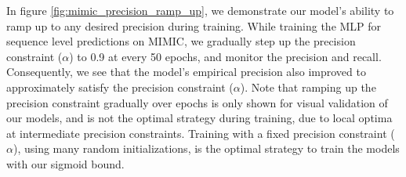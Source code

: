 In figure \ref{fig:mimic_precision_ramp_up}, we demonstrate our model's ability to ramp up to any desired precision during training. While training the MLP for sequence level predictions on MIMIC, we gradually step up the precision constraint ($\alpha$) to 0.9 at every 50 epochs, and monitor the precision and recall. Consequently, we see that the model's empirical precision also improved to approximately satisfy the precision constraint ($\alpha$). Note that ramping up the precision constraint gradually over epochs is only shown for visual validation of our models, and is not the optimal strategy during training, due to local optima at intermediate precision constraints. Training with a fixed precision constraint ($\alpha$), using many random initializations, is the optimal strategy to train the models with our sigmoid bound.